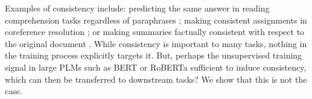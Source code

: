 Examples of consistency include: predicting the same answer in reading comprehension tasks regardless of paraphrases \cite{consistent-qa}; making consistent assignments in coreference resolution \cite{denis2009global,chang2011inference}; or making summaries factually consistent with respect to the original document \cite{kryscinski2020evaluating}.
While consistency is important to many tasks, nothing in the training process explicitly targets it. But, perhaps the unsupervised training signal in large PLMs such as BERT or RoBERTa \cite{bert,roberta}  sufficient to induce consistency, which can then be transferred to downstream tasks? 
We show that this is not the case.


